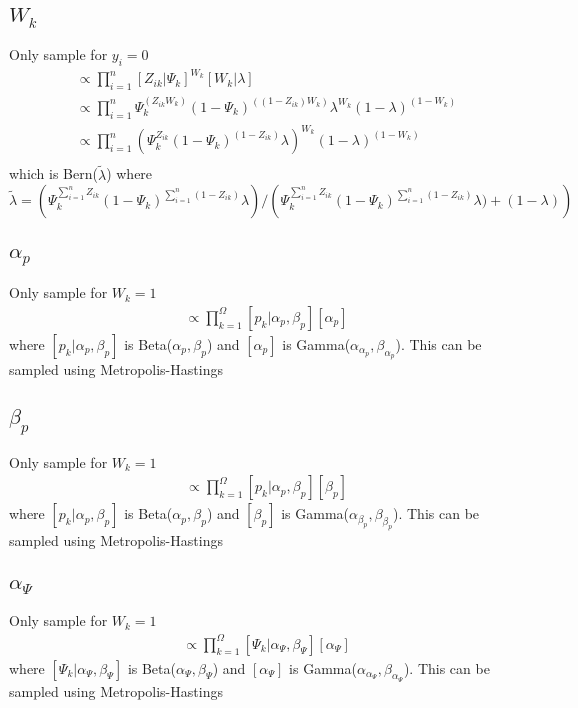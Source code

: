 \documentclass[fleqn]{article}
\begin{document}
\subsection{$W_k$}
%
Only sample for $y_i = 0$
%
\begin{align*}
  [W_k | \cdot] & \propto \prod_{i = 1}^n [Z_{ik} | \Psi_k]^{W_k} [W_k | \lambda]\\
  & \propto \prod_{i = 1}^n \Psi_k^{(Z_{ik} W_k)} (1 - \Psi_k)^{\left( (1 - Z_{ik}) W_k \right)} \lambda^{W_k} (1 - \lambda)^{(1 - W_k)}\\
  & \propto \prod_{i = 1}^n \left(\Psi_k^{Z_{ik}} (1 - \Psi_k)^{(1 - Z_{ik})} \lambda \right)^{W_k} (1 - \lambda)^{(1 - W_k)}\\
\end{align*}
%
which is Bern($\tilde{\lambda}$) where $\tilde{\lambda} = \left(\Psi_k^{\sum_{i = 1}^n Z_{ik}} (1 - \Psi_k)^{\sum_{i = 1}^n (1 - Z_{ik})} \lambda \right) / \left(\Psi_k^{\sum_{i = 1}^n Z_{ik}} (1 - \Psi_k)^{\sum_{i = 1}^n (1 - Z_{ik})} \lambda) + (1 - \lambda) \right)$
%
\subsection{$\alpha_p$}
%
Only sample for $W_k = 1$
%
\begin{align*}
  [\alpha_p | \cdot] & \propto \prod_{k = 1}^\Omega [p_k | \alpha_p, \beta_p] [\alpha_p]
\end{align*}
where $[p_k | \alpha_p, \beta_p]$ is Beta($\alpha_p, \beta_p$) and $[\alpha_p]$ is Gamma($\alpha_{\alpha_p}, \beta_{\alpha_p}$). This can be sampled using Metropolis-Hastings
%
\subsection{$\beta_p$}
%
Only sample for $W_k = 1$
%
\begin{align*}
  [\beta_p | \cdot] & \propto \prod_{k = 1}^\Omega [p_k | \alpha_p, \beta_p] [\beta_p]
\end{align*}
where $[p_k | \alpha_p, \beta_p]$ is Beta($\alpha_p, \beta_p$) and $[\beta_p]$ is Gamma($\alpha_{\beta_p}, \beta_{\beta_p}$). This can be sampled using Metropolis-Hastings
%
\subsection{$\alpha_\Psi$}
%
Only sample for $W_k = 1$
%
\begin{align*}
  [\alpha_\Psi | \cdot] & \propto \prod_{k = 1}^\Omega [\Psi_k | \alpha_\Psi, \beta_\Psi] [\alpha_\Psi]
\end{align*}
where $[\Psi_k | \alpha_\Psi, \beta_\Psi]$ is Beta($\alpha_\Psi, \beta_\Psi$) and $[\alpha_\Psi]$ is Gamma($\alpha_{\alpha_\Psi}, \beta_{\alpha_\Psi}$). This can be sampled using Metropolis-Hastings
%
\end{document}
